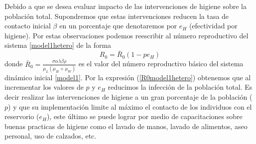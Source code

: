 \documentclass[12pt,a4paper]{article}
\theoremstyle{plain}%
\theoremstyle{definition}
\theoremstyle{remark}
\begin{document}
	Debido a que se desea evaluar impacto de las intervenciones de higiene sobre 
	la población total.
	Supondremos que estas intervenciones reducen la tasa de contacto inicial $\beta$ en un porcentaje que denotaremos por $e_H$ (efectividad por higiene). 
	Por estas observaciones podemos reescribir al número reproductivo del sistema \eqref{model1hetero} de la forma  
	\begin{equation}\label{R0model1hetero}
	R_0=\bar R_0  (1- p e_H )
	\end{equation}	
	donde $\bar R_0=\frac{\sigma \alpha \lambda \beta \rho}{ \mu_L (\mu_H+\mu_W)}$ es el valor del número reproductivo básico del sistema dinámico inicial \eqref{model1}. Por la expresión (\ref{R0model1hetero}) obtenemos que 
	al incrementar los valores de $p$ y $e_H$ reducimos la infección %
	de la población total. 
	{%
	Es decir 
	realizar las intervenciones de higiene 
	a un gran porcentaje de la población ($p$) y que su implementación limite al máximo el contacto de los individuos con el reservorio ($e_H$), 
este último se puede lograr 
por medio de capacitaciones sobre 
	buenas practicas de higiene como el lavado de manos, lavado de alimentos, aseo personal, uso de calzados, etc.
	}
	
	
\end{document}
